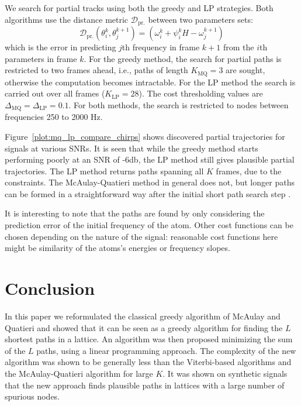 \documentclass{article}
\begin{document}
\begin{sloppy}
We search for partial tracks using both the greedy and LP strategies. Both
algorithms use the distance metric $\mathcal{D}_{\text{pr.}}$ between two parameters sets:
\[
    \mathcal{D}_{\text{pr.}} \left( \theta_{i}^{k},
    \theta_{j}^{k+1} \right) = \left( \omega_{i}^{k} +
    \psi_{i}^{k} H - \omega_{j}^{k+1} \right)
\]
which is the error in predicting $j$th frequency in frame $k+1$ from the $i$th
parameters in frame $k$. For the greedy method, the search for partial paths is
restricted to two frames ahead, i.e., paths of length $K_{\text{MQ}}=3$ are sought, otherwise the
computation becomes intractable. For the LP
method the search is carried out over all frames ($K_{\text{LP}}=28$). %
The cost thresholding values are ${\Delta_{\text{MQ}} = \Delta_{\text{LP}} =
0.1}$. For both methods, the search is restricted
to nodes between frequencies 250 to 2000 Hz.

Figure~\ref{plot:mq_lp_compare_chirps}
shows discovered partial trajectories for signals at various SNRs. It is seen
that while the greedy method starts performing poorly at an SNR of -6db, the LP method
still gives plausible partial trajectories. The LP method returns paths spanning
all $K$ frames, due to the constraints. The McAulay-Quatieri method in general does not,
but longer paths can be formed in a straightforward way after the initial short path
search step \cite{mcaulay1986speech}.

It is interesting to note that the paths are found by only considering the
prediction error of the initial frequency of the atom. Other cost functions can
be chosen depending on the nature of the signal: reasonable cost functions here
might be similarity of the atoms's energies or frequency slopes.

\section{Conclusion}

In this paper we reformulated the classical greedy algorithm of McAulay and
Quatieri and showed that it can be seen as a greedy algorithm for finding the $L$
shortest paths in a lattice. An algorithm was then proposed minimizing the sum
of the $L$ paths, using a linear programming approach. The complexity of the new
algorithm was shown to be generally less than the Viterbi-based algorithms and
the McAulay-Quatieri algorithm for large $K$.
It was shown on synthetic signals that the new approach finds plausible paths in
lattices with a large number of spurious nodes.


\end{sloppy}
\end{document}
